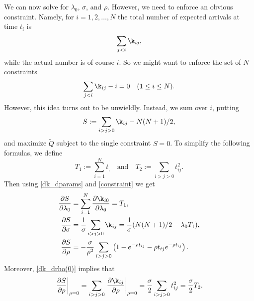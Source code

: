 \documentclass[12pt,leqno]{article}
\begin{document}
We can now solve for $\lambda_0$, $\sigma$, and $\rho$.  However, we
need to enforce an obvious constraint.  Namely,
for $i = 1,2,\dots,N$ the total number of expected arrivals at time $t_i$ is 
$$
\sum_{j<i}\k_{ij},
$$
while the actual number is of course $i$.  So we might want to enforce
the set of $N$ constraints
$$
\sum_{j < i}\k_{ij} - i = 0 \quad(1\le i\le N).
$$
However, this idea turns out to be unwieldly.  Instead, we sum over $i$, putting
\begin{equation}\label{constraint}
S := \sum_{i>j>0}\k_{ij} - N(N+1)/2,
\end{equation}
and maximize $\tilde{Q}$ subject to the single constraint $S = 0$.  To simplify the following
formulas, we define
$$
T_1 := \sum_{i=1}^Nt_,\quad\text{and}\quad T_2 := \sum_{i>j>0}t_{ij}^2.
$$
Then using \eqref{dk_dparams} and \eqref{constraint} we get
\begin{equation}\label{dS_dparams}
  \begin{split}
    \frac{\partial{S}}{\partial\lambda_0} &= \sum_{i=1}^N\frac{\partial \k_{i0}}{\partial\lambda_0} = T_1,\\
    \frac{\partial{S}}{\partial\sigma} &= \frac{1}{\sigma}\sum_{i>j>0}\k_{ij} = \frac{1}{\sigma}(N(N+1)/2 - \lambda_0T_1),\\
    \frac{\partial{S}}{\partial\rho} &= -\frac{\sigma}{\rho^2}\sum_{i>j>0}\left(1-e^{-\rho t_{ij}}-\rho t_{ij}e^{-\rho t_{ij}}\right).
  \end{split}
\end{equation}
Moreover, \eqref{dk_drho(0)} implies that
\begin{equation}\label{dS_drho(0)}
  \left.\frac{\partial S}{\partial\rho}\right|_{\rho=0} = \sum_{i>j>0}\left.\frac{\partial\k_{ij}}{\partial\rho}\right|_{\rho=0}
  = \frac{\sigma}{2}\sum_{i>j>0}t_{ij}^2 = \frac{\sigma}{2}T_2.
\end{equation}
\end{document}
